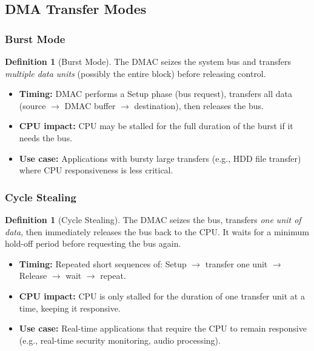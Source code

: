 \documentclass[11pt, a4paper, notitlepage]{report}
\theoremstyle{definition}
\newtheorem{definition}[theorem]{Definition}
\theoremstyle{remark}
\theoremstyle{definition}
\begin{document}
\subsection{DMA Transfer Modes}
\label{sec:dma-modes}

\subsubsection{Burst Mode}

\begin{definition}[Burst Mode]
  \label{def:burst}
  The DMAC seizes the system bus and transfers \emph{multiple data units} (possibly the entire block) before releasing control.
\end{definition}

\begin{itemize}
  \item \textbf{Timing:} DMAC performs a Setup phase (bus request), transfers all data (source $\to$ DMAC buffer $\to$ destination), then releases the bus.
  \item \textbf{CPU impact:} CPU may be stalled for the full duration of the burst if it needs the bus.
  \item \textbf{Use case:} Applications with bursty large transfers (e.g., HDD file transfer) where CPU responsiveness is less critical.
\end{itemize}

\subsubsection{Cycle Stealing}

\begin{definition}[Cycle Stealing]
  \label{def:cycle-stealing}
  The DMAC seizes the bus, transfers \emph{one unit of data}, then immediately releases the bus back to the CPU. It waits for a minimum hold-off period before requesting the bus again.
\end{definition}

\begin{itemize}
  \item \textbf{Timing:} Repeated short sequences of: Setup $\to$ transfer one unit $\to$ Release $\to$ wait $\to$ repeat.
  \item \textbf{CPU impact:} CPU is only stalled for the duration of one transfer unit at a time, keeping it responsive.
  \item \textbf{Use case:} Real-time applications that require the CPU to remain responsive (e.g., real-time security monitoring, audio processing).
\end{itemize}
\end{document}
